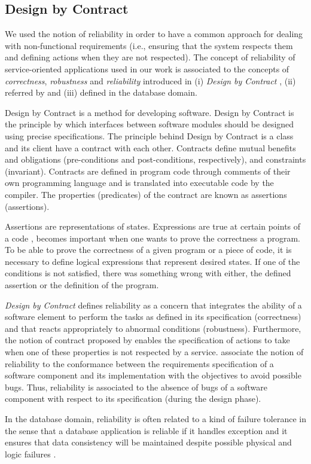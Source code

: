 {\subsection{Design by Contract}

 We used the notion of reliability in order to have a common approach for dealing
with non-functional requirements (i.e., ensuring that the system respects them
and defining actions when they are not respected). The concept of reliability of
service-oriented applications used in our work is associated to the concepts of
{\it correctness}, {\it robustness} and {\it reliability} introduced in (i)
\textit{Design by Contract} \cite{Meyer92,MeyerN93,Meyer97}, (ii) referred by
\cite{Meyer92,Meyer97} and (iii) defined in the database domain.

Design by Contract is a method for developing software. Design by Contract is
the principle by which interfaces between software modules should be designed
using precise specifications. The principle behind Design by Contract is a class
and its client have a contract with each other. Contracts define mutual benefits
and obligations (pre-conditions and post-conditions, respectively), and
constraints (invariant). Contracts are defined in program code through comments
of their own programming language and is translated into executable code by the
compiler. The properties (predicates) of the contract are known as assertions
(assertions). 

Assertions are representations of states. Expressions are true at certain points
of a code \cite{Meyer92}, becomes important when one wants to prove the correctness
a program. To be able to prove the correctness of a given program
or a piece of code, it is necessary to define logical expressions that represent
desired states. If one of the conditions is not satisfied, there was something
wrong with either, the defined assertion or the definition of the program.   


\textit{Design by Contract} defines reliability as a concern that integrates the
ability of a software element to perform the tasks as defined in its
specification (correctness) and that reacts appropriately to abnormal conditions
(robustness). Furthermore,  the notion of contract proposed by
\cite{Meyer92,MeyerN93,Meyer97} enables the specification of actions to take
when one of these properties is not respected by a service.
\cite{Meyer92,Meyer97} associate the notion of reliability to the conformance
between the requirements specification of a software component and its
implementation with the objectives to avoid possible bugs. Thus, reliability is
associated to the absence of bugs of a software component with respect to its
specification (during the design phase).      
 
 In the database domain, reliability is often related to a kind of failure
 tolerance in the sense that a database application is reliable if it handles
 exception and it ensures that data consistency will be maintained despite
 possible physical and logic failures \cite{Adiba:1981,MartinAD92}.

}

